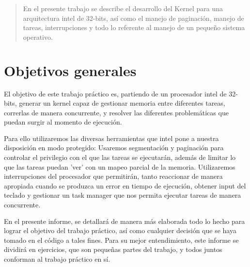 \documentclass[a4paper]{article}
\begin{document}
\thispagestyle{empty}

\maketitle
\newpage

\thispagestyle{empty}
\vfill
\begin{abstract}
En el presente trabajo se describe el desarrollo del Kernel para una arquitectura intel de 32-bits, así como el manejo de paginación, manejo de tareas, interrupciones y todo lo referente al manejo de un pequeño sistema operativo.

\end{abstract}

\thispagestyle{empty}
\vspace{3cm}
\tableofcontents
\newpage

\newpage

\section{Objetivos generales}

El objetivo de este trabajo práctico es, partiendo de un procesador intel de 32-bits, generar un kernel capaz de gestionar memoria entre diferentes tareas, correrlas de manera concurrente, y resolver las diferentes problemáticas que puedan surgir al momento de ejecución.

Para ello utilizaremos las diversas herramientas que intel pone a nuestra disposición en modo protegido: Usaremos segmentación y paginación para controlar el privilegio con el que las tareas se ejecutarán, además de limitar lo que las tareas puedan 'ver' con un mapeo parcial de la memoria.
Utilizaremos interrupciones del procesador que permitirán, tanto reaccionar de manera apropiada cuando se produzca un error en tiempo de ejecución, obtener input del teclado y gestionar un task manager que nos permita ejecutar tareas de manera concurrente.

En el presente informe, se detallará de manera más elaborada todo lo hecho para lograr el objetivo del trabajo práctico, así como cualquier decisión que se haya tomado en el código a tales fines. Para su mejor entendimiento, este informe se dividirá en ejercicios, que son pequeñas partes del trabajo, y todos juntos conforman al trabajo práctico en sí. 
\end{document}
